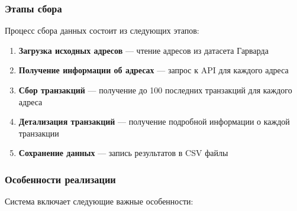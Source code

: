 \subsubsection{Этапы сбора}

Процесс сбора данных состоит из следующих этапов:

\begin{enumerate}
    \item \textbf{Загрузка исходных адресов} --- чтение адресов из датасета Гарварда
    \item \textbf{Получение информации об адресах} --- запрос к API для каждого адреса
    \item \textbf{Сбор транзакций} --- получение до 100 последних транзакций для каждого адреса
    \item \textbf{Детализация транзакций} --- получение подробной информации о каждой транзакции
    \item \textbf{Сохранение данных} --- запись результатов в CSV файлы
\end{enumerate}

\subsubsection{Особенности реализации}

Система включает следующие важные особенности:

